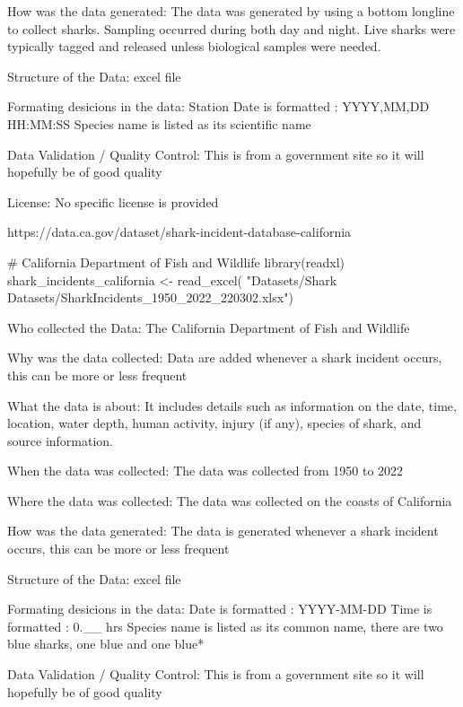 \documentclass[
  letterpaper,
  DIV=11,
  numbers=noendperiod]{scrreprt}
\newenvironment{Shaded}{\begin{snugshade}}{\end{snugshade}}
\newcommand{\CommentTok}[1]{\textcolor[rgb]{0.37,0.37,0.37}{#1}}
\newcommand{\FunctionTok}[1]{\textcolor[rgb]{0.28,0.35,0.67}{#1}}
\newcommand{\NormalTok}[1]{\textcolor[rgb]{0.00,0.23,0.31}{#1}}
\newcommand{\OtherTok}[1]{\textcolor[rgb]{0.00,0.23,0.31}{#1}}
\newcommand{\StringTok}[1]{\textcolor[rgb]{0.13,0.47,0.30}{#1}}
\begin{document}
How was the data generated: The data was generated by using a bottom
longline to collect sharks. Sampling occurred during both day and night.
Live sharks were typically tagged and released unless biological samples
were needed.

Structure of the Data: excel file

Formating desicions in the data: Station Date is formatted : YYYY,MM,DD
HH:MM:SS Species name is listed as its scientific name

Data Validation / Quality Control: This is from a government site so it
will hopefully be of good quality

License: No specific license is provided

https://data.ca.gov/dataset/shark-incident-database-california

\begin{Shaded}
\begin{Highlighting}[]
\CommentTok{\# California Department of Fish and Wildlife}
\FunctionTok{library}\NormalTok{(readxl)}
\NormalTok{shark\_incidents\_california }\OtherTok{\textless{}{-}} \FunctionTok{read\_excel}\NormalTok{(}
  \StringTok{"Datasets/Shark Datasets/SharkIncidents\_1950\_2022\_220302.xlsx"}\NormalTok{)}
\end{Highlighting}
\end{Shaded}

Who collected the Data: The California Department of Fish and Wildlife

Why was the data collected: Data are added whenever a shark incident
occurs, this can be more or less frequent

What the data is about: It includes details such as information on the
date, time, location, water depth, human activity, injury (if any),
species of shark, and source information.

When the data was collected: The data was collected from 1950 to 2022

Where the data was collected: The data was collected on the coasts of
California

How was the data generated: The data is generated whenever a shark
incident occurs, this can be more or less frequent

Structure of the Data: excel file

Formating desicions in the data: Date is formatted : YYYY-MM-DD Time is
formatted : 0.\_\_ hrs Species name is listed as its common name, there
are two blue sharks, one blue and one blue*

Data Validation / Quality Control: This is from a government site so it
will hopefully be of good quality
\end{document}
